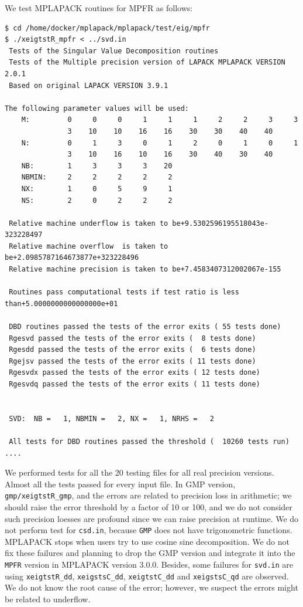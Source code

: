 \documentclass[12pt]{article}
\begin{document}
We test MPLAPACK routines for MPFR as follows:
\begin{verbatim}
$ cd /home/docker/mplapack/mplapack/test/eig/mpfr
$ ./xeigtstR_mpfr < ../svd.in
 Tests of the Singular Value Decomposition routines
 Tests of the Multiple precision version of LAPACK MPLAPACK VERSION 2.0.1
 Based on original LAPACK VERSION 3.9.1

The following parameter values will be used:
    M:         0     0     0     1     1     1     2     2     3     3
               3    10    10    16    16    30    30    40    40
    N:         0     1     3     0     1     2     0     1     0     1
               3    10    16    10    16    30    40    30    40
    NB:        1     3     3     3    20
    NBMIN:     2     2     2     2     2
    NX:        1     0     5     9     1
    NS:        2     0     2     2     2

 Relative machine underflow is taken to be+9.5302596195518043e-323228497
 Relative machine overflow  is taken to be+2.0985787164673877e+323228496
 Relative machine precision is taken to be+7.4583407312002067e-155

 Routines pass computational tests if test ratio is less than+5.0000000000000000e+01

 DBD routines passed the tests of the error exits ( 55 tests done)
 Rgesvd passed the tests of the error exits (  8 tests done)
 Rgesdd passed the tests of the error exits (  6 tests done)
 Rgejsv passed the tests of the error exits ( 11 tests done)
 Rgesvdx passed the tests of the error exits ( 12 tests done)
 Rgesvdq passed the tests of the error exits ( 11 tests done)


 SVD:  NB =   1, NBMIN =   2, NX =   1, NRHS =   2

 All tests for DBD routines passed the threshold (  10260 tests run)
....
\end{verbatim}
We performed tests for all the 20 testing files for all real precision versions.
Almost all the tests passed for every input file.
In GMP version, {\tt gmp/xeigtstR\_gmp}, and the errors are related to precision loss in arithmetic; we should raise the error threshold by a factor of 10 or 100, and we do not consider such precision loesses are profound
since we can raise precision at runtime.
We do not perform test for {\tt csd.in}, because {\tt GMP} does not have trigonometric functions. MPLAPACK stops
when users try to use cosine sine decomposition.
We do not fix these failures and planning to drop the GMP version and integrate it into the {\tt MPFR} version in MPLAPACK version 3.0.0.
Besides, some failures for {\tt svd.in} are using {\tt xeigtstR\_dd}, {\tt xeigstsC\_dd}, {\tt xeigtstC\_dd} and {\tt xeigstsC\_qd} are observed.
We do not know the root cause of the error; however, we suspect the errors might be related to underflow.
\end{document}
